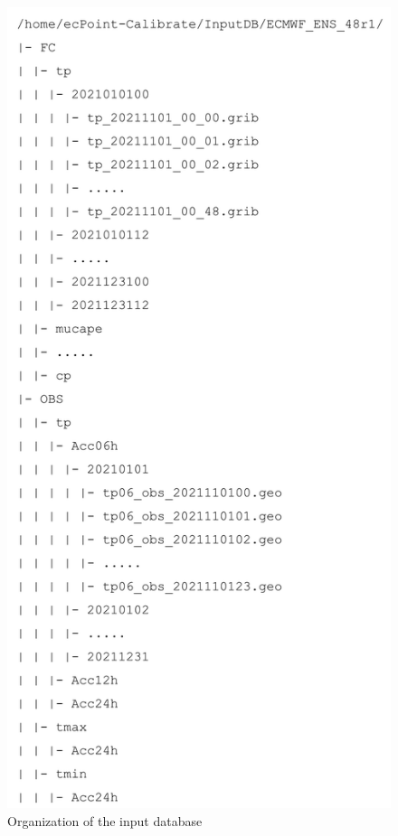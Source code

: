 \documentclass[techmemo]{ecmwfrep}%
\begin{document}
\begin{figure}
\includegraphics{Figures/Input_Database.png}
\caption{Organization of the input database}
\label{Input_Database}
\end{figure}
\end{document}
